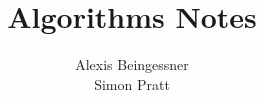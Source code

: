 \documentclass[11pt]{book}
\title{Algorithms Notes}
\date{}
\author{Alexis Beingessner\\Simon Pratt}
\theoremstyle{definition}
\begin{document}
\maketitle
\tableofcontents
\begin{multicols}{2}
  
  
  
  
  
  
  
  
  
  
  
  
  
  
  

\end{multicols}
\end{document}
